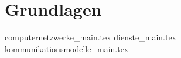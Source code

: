 
\part{Grundlagen}

{computernetzwerke_main.tex}
{dienste_main.tex}
{kommunikationsmodelle_main.tex}

